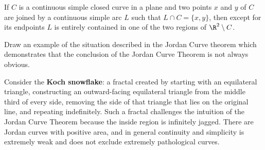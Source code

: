 \begin{response}
\begin{enumerate}
  \end{enumerate}
\end{response}

\begin{theorem} If $C$ is a continuous simple closed curve in a plane and two points $x$ and $y$ of $C$ are joined by a continuous simple arc $L$ such that $L \cap C = \{x, y\}$, then except for its endpoints $L$ is entirely contained in one of the two regions of $\R^2 \setminus C$.
\end{theorem}

\begin{exercise} Draw an example of the situation described in the Jordan Curve theorem which demonstrates that the conclusion of the Jordan Curve Theorem is not always obvious.
\end{exercise}
\begin{response}
  Consider the \textbf{Koch snowflake}: a fractal created by starting with an equilateral triangle, constructing an outward-facing equilateral triangle from the middle third of every side, removing the side of that triangle that lies on the original line, and repeating indefinitely. Such a fractal challenges the intuition of the Jordan Curve Theorem because the inside region is infinitely jagged. There are Jordan curves with positive area, and in general continuity and simplicity is extremely weak and does not exclude extremely pathological curves.
\end{response}

